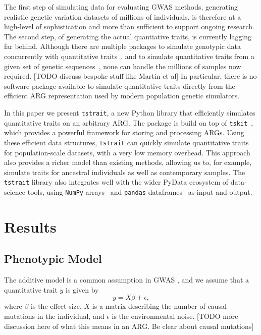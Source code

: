 \documentclass[unnumsec,webpdf,modern,large,namedate]{oup-authoring-template}%
\begin{document}
The first step of simulating data for evaluating GWAS methods,
generating realistic genetic variation datasets of millions
of individuals, is therefore at a high-level of sophistication
and more than sufficient to support ongoing research.
The second step, of generating the actual quantiative traits,
is currently lagging far behind.
Although there are multiple packages to simulate genotypic data
concurrently with quantitative traits~\citep{gaynor2021,haller2023},
and to simulate quantitative traits from a given set of genetic
sequences~\citep[e.g.][]{meyer2018,fernandes2020}, none can
handle the millions of samples now required.
[TODO discuss bespoke stuff like Martin et al]
In particular, there is no software package available to simulate quantitative
traits directly from the efficient ARG representation used by
modern population genetic simulators.

In this paper we present \texttt{tstrait}, a new Python library that
efficiently simulates quantitative traits on an arbitrary ARG.
The package is build on top of
\texttt{tskit}~\citep{ralph2020}, which provides a powerful
framework for storing and processing ARGs.
Using these efficient data structures, \texttt{tstrait} can
quickly simulate quantitative traits for population-scale datasets,
with a very low memory overhead. This approach also provides a
richer model than existing methods,
allowing us to, for example, simulate traits for
ancestral individuals as well as contemporary samples.
The \texttt{tstrait} library also integrates well with the wider
PyData ecosystem of data-science tools,
using
\texttt{NumPy} arrays~\citep{numpy} and
\texttt{pandas} dataframes~\citep{pandas}
as input and output.

\section{Results}
\subsection{Phenotypic Model}
The additive model is a common assumption in GWAS
\citep{uffelmann2021}, and we assume that a quantitative trait $y$
is given by
\[
y=X\beta+\epsilon,
\]
where $\beta$ is the effect size, $X$ is a matrix describing the number
of causal mutations in the individual, and $\epsilon$ is the environmental
noise.
[TODO more discussion here of what this means in an ARG. Be clear about
causal mutations]
\end{document}
